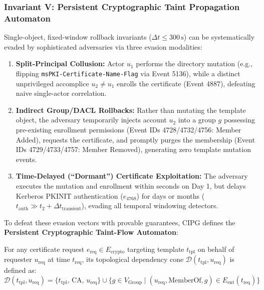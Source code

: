\subsubsection{Invariant V: Persistent Cryptographic Taint Propagation Automaton}
\label{sec:crypto_taint_automaton}
Single-object, fixed-window rollback invariants ($\Delta t \le 300\,\text{s}$) can be systematically evaded by sophisticated adversaries via three evasion modalities:
\begin{enumerate}
    \item \textbf{Split-Principal Collusion:} Actor $u_1$ performs the directory mutation (e.g., flipping \texttt{msPKI-Certificate-Name-Flag} via Event 5136), while a distinct unprivileged accomplice $u_2 \neq u_1$ enrolls the certificate (Event 4887), defeating naive single-actor correlation.
    \item \textbf{Indirect Group/DACL Rollbacks:} Rather than mutating the template object, the adversary temporarily injects account $u_2$ into a group $g$ possessing pre-existing enrollment permissions (Event IDs 4728/4732/4756: Member Added), requests the certificate, and promptly purges the membership (Event IDs 4729/4733/4757: Member Removed), generating zero template mutation events.
    \item \textbf{Time-Delayed (``Dormant'') Certificate Exploitation:} The adversary executes the mutation and enrollment within seconds on Day 1, but delays Kerberos PKINIT authentication ($e_{4768}$) for days or months ($t_{\text{auth}} \gg t_2 + \Delta t_{\text{transient}}$), evading all temporal windowing detectors.
\end{enumerate}

To defeat these evasion vectors with provable guarantees, CIPG defines the \textbf{Persistent Cryptographic Taint-Flow Automaton}:

\begin{definition}
For any certificate request $e_{\text{req}} \in E_{\text{crypto}}$ targeting template $t_{\text{tpl}}$ on behalf of requester $u_{\text{req}}$ at time $t_{\text{req}}$, its topological dependency cone $\mathcal{D}(t_{\text{tpl}}, u_{\text{req}})$ is defined as:
\begin{equation}
\mathcal{D}(t_{\text{tpl}}, u_{\text{req}}) = \{t_{\text{tpl}}, \, \text{CA}, \, u_{\text{req}}\} \cup \{g \in V_{\text{Group}} \mid (u_{\text{req}}, \text{MemberOf}, g) \in E_{\text{ent}}(t_{\text{req}})\}
\end{equation}
\end{definition}

